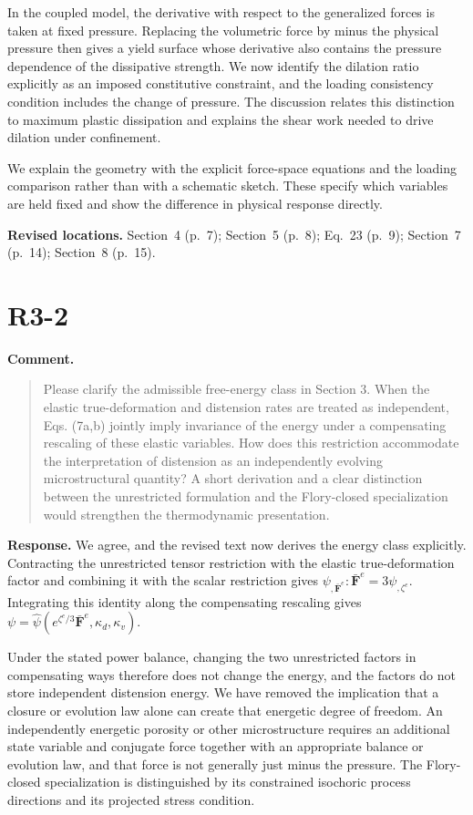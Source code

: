 \documentclass[11pt]{article}
\begin{document}
In the coupled model, the derivative with respect to the generalized forces is
taken at fixed pressure. Replacing the volumetric force by minus the physical
pressure then gives a yield surface whose derivative also contains the pressure
dependence of the dissipative strength. We now identify the dilation ratio
explicitly as an imposed constitutive constraint, and the loading consistency
condition includes the change of pressure. The discussion relates this
distinction to maximum plastic dissipation and explains the shear work needed
to drive dilation under confinement.

We explain the geometry with the explicit force-space equations and the loading
comparison rather than with a schematic sketch. These specify which variables
are held fixed and show the difference in physical response directly.

\textbf{Revised locations.} Section~4 (p.~7); Section~5 (p.~8); Eq.~23 (p.~9); Section~7 (p.~14); Section~8 (p.~15).
\section{R3-2}
\textbf{Comment.}\begin{quote}\small
Please clarify the admissible free-energy class in Section 3. When the elastic true-deformation and distension rates are treated as independent, Eqs. (7a,b) jointly imply invariance of the energy under a compensating rescaling of these elastic variables. How does this restriction accommodate the interpretation of distension as an independently evolving microstructural quantity? A short derivation and a clear distinction between the unrestricted formulation and the Flory-closed specialization would strengthen the thermodynamic presentation.
\end{quote}
\textbf{Response.} We agree, and the revised text now derives the energy class
explicitly. Contracting the unrestricted tensor restriction with the elastic
true-deformation factor and combining it with the scalar restriction gives
\(\psi_{,\bar{\mathbf F}^e}:\bar{\mathbf F}^e=3\psi_{,\zeta^e}\). Integrating
this identity along the compensating rescaling gives
\(\psi=\widehat\psi(e^{\zeta^e/3}\bar{\mathbf F}^e,\kappa_d,\kappa_v)\).

Under the stated power balance, changing the two unrestricted factors in
compensating ways therefore does not change the energy, and the factors do not
store independent distension energy. We have removed the implication that a
closure or evolution law alone can create that energetic degree of freedom. An
independently energetic porosity or other microstructure requires an additional
state variable and conjugate force together with an appropriate balance or
evolution law, and that force is not generally just minus the pressure. The
Flory-closed specialization is distinguished by its constrained isochoric
process directions and its projected stress condition.
\end{document}
